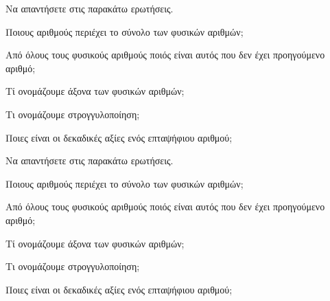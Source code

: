 Να απαντήσετε στις παρακάτω ερωτήσεις.
\begin{rlist}
\item Ποιους αριθμούς περιέχει το σύνολο των φυσικών αριθμών;
\item Από όλους τους φυσικούς αριθμούς ποιός είναι αυτός που δεν έχει προηγούμενο αριθμό;
\item Τί ονομάζουμε άξονα των φυσικών αριθμών;
\item Τι ονομάζουμε στρογγυλοποίηση;
\item Ποιες είναι οι δεκαδικές αξίες ενός επταψήφιου αριθμού;
\end{rlist}
Να απαντήσετε στις παρακάτω ερωτήσεις.
\begin{rlist}
\item Ποιους αριθμούς περιέχει το σύνολο των φυσικών αριθμών;
\item Από όλους τους φυσικούς αριθμούς ποιός είναι αυτός που δεν έχει προηγούμενο αριθμό;
\item Τί ονομάζουμε άξονα των φυσικών αριθμών;
\item Τι ονομάζουμε στρογγυλοποίηση;
\item Ποιες είναι οι δεκαδικές αξίες ενός επταψήφιου αριθμού;
\end{rlist}
